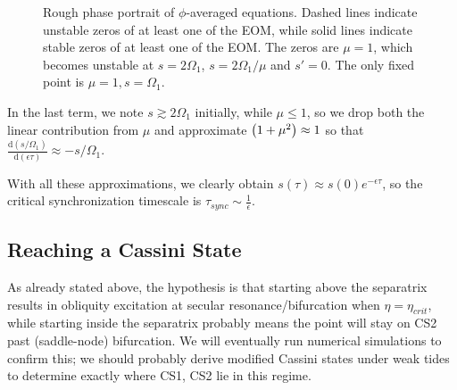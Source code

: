 \documentclass[11pt,
        usenames, %
        dvipsnames %
    ]{article}
\newcommand*{\rd}[2]{\frac{\mathrm{d}#1}{\mathrm{d}#2}}
\DeclarePairedDelimiter\p{\lparen}{\rparen}
\begin{document}
\begin{figure}[t]
    \centering
    \caption{Rough phase portrait of $\phi$-averaged equations. Dashed lines
    indicate unstable zeros of at least one of the EOM, while solid lines
    indicate stable zeros of at least one of the EOM\@. The zeros are $\mu = 1$,
    which becomes unstable at $s = 2\Omega_1$, $s = 2\Omega_1/\mu$ and $s' = 0$.
    The only fixed point is $\mu = 1, s = \Omega_1$.}\label{fig:phi_avg}
\end{figure}
In the last term, we note $s \gtrsim 2\Omega_1$ initially, while $\mu \leq 1$,
so we drop both the linear contribution from $\mu$ and approximate $\p*{1 +
\mu^2} \approx 1$ so that $\rd{(s/\Omega_1)}{(\epsilon\tau)} \approx
-s/\Omega_1$.

With all these approximations, we clearly obtain $s(\tau) \approx
s(0)e^{-\epsilon \tau}$, so the critical synchronization
timescale is $\tau_{sync} \sim \frac{1}{\epsilon}$.

\subsection{Reaching a Cassini State}

As already stated above, the hypothesis is that starting above the separatrix
results in obliquity excitation at secular resonance/bifurcation when $\eta =
\eta_{crit}$, while starting inside the separatrix probably means the point will
stay on CS2 past (saddle-node) bifurcation. We will eventually run numerical
simulations to confirm this; we should probably derive modified Cassini states
under weak tides to determine exactly where CS1, CS2 lie in this regime.
\end{document}
